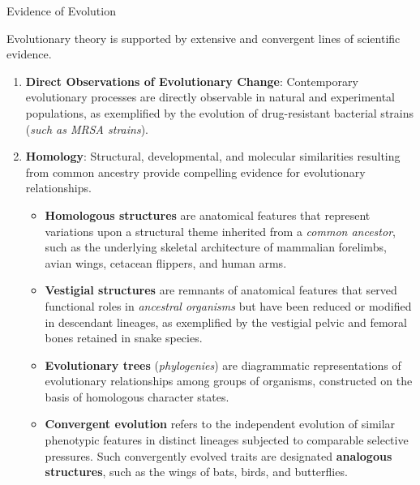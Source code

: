 \documentclass[10pt]{article}
\begin{document}
    \begin{core}{Evidence of Evolution}

      Evolutionary theory is supported by extensive and convergent lines of scientific evidence.

      \begin{enumerate}

        \item \textbf{Direct Observations of Evolutionary Change}: Contemporary evolutionary processes are directly observable in natural and experimental populations, as exemplified by the evolution of drug-resistant bacterial strains (\textit{such as MRSA strains}).

        \item \textbf{Homology}: Structural, developmental, and molecular similarities resulting from common ancestry provide compelling evidence for evolutionary relationships.

          \begin{itemize}

            \item \textbf{Homologous structures} are anatomical features that represent variations upon a structural theme inherited from a \textit{common ancestor}, such as the underlying skeletal architecture of mammalian forelimbs, avian wings, cetacean flippers, and human arms. 


            \item \textbf{Vestigial structures} are remnants of anatomical features that served functional roles in \textit{ancestral organisms} but have been reduced or modified in descendant lineages, as exemplified by the vestigial pelvic and femoral bones retained in snake species.


            \item \textbf{Evolutionary trees} (\textit{phylogenies}) are diagrammatic representations of evolutionary relationships among groups of organisms, constructed on the basis of homologous character states.


            \item \textbf{Convergent evolution} refers to the independent evolution of similar phenotypic features in distinct lineages subjected to comparable selective pressures. Such convergently evolved traits are designated \textbf{analogous structures}, such as the wings of bats, birds, and butterflies.


\end{itemize}
\end{enumerate}
\end{core}
\end{document}

